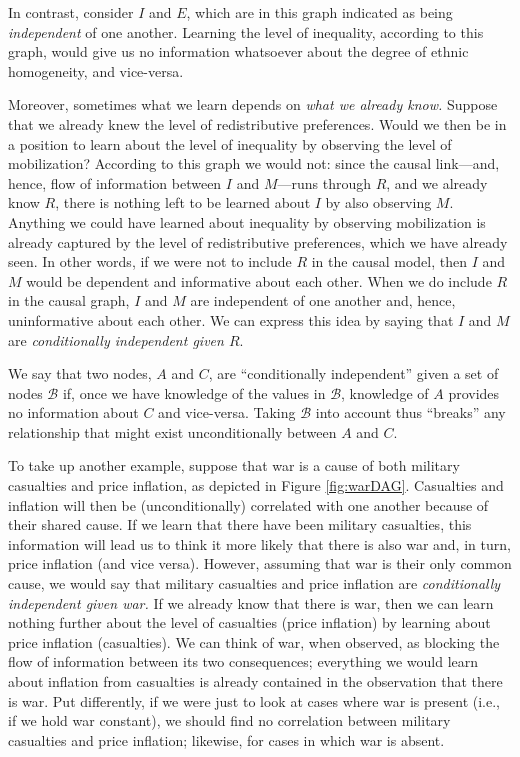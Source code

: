 \documentclass[
  12pt,
]{book}
\begin{document}
In contrast, consider \(I\) and \(E\), which are in this graph indicated as being \emph{independent} of one another. Learning the level of inequality, according to this graph, would give us no information whatsoever about the degree of ethnic homogeneity, and vice-versa.

Moreover, sometimes what we learn depends on \emph{what we already know.} Suppose that we already knew the level of redistributive preferences. Would we then be in a position to learn about the level of inequality by observing the level of mobilization? According to this graph we would not: since the causal link---and, hence, flow of information between \(I\) and \(M\)---runs through \(R\), and we already know \(R\), there is nothing left to be learned about \(I\) by also observing \(M\). Anything we could have learned about inequality by observing mobilization is already captured by the level of redistributive preferences, which we have already seen. In other words, if we were not to include \(R\) in the causal model, then \(I\) and \(M\) would be dependent and informative about each other. When we do include \(R\) in the causal graph, \(I\) and \(M\) are independent of one another and, hence, uninformative about each other. We can express this idea by saying that \(I\) and \(M\) are \emph{conditionally independent given \(R\)}.

We say that two nodes, \(A\) and \(C\), are ``conditionally independent'' given a set of nodes \(\mathcal B\) if, once we have knowledge of the values in \(\mathcal B\), knowledge of \(A\) provides no information about \(C\) and vice-versa. Taking \(\mathcal B\) into account thus ``breaks'' any relationship that might exist unconditionally between \(A\) and \(C\).

To take up another example, suppose that war is a cause of both military casualties and price inflation, as depicted in Figure \ref{fig:warDAG}. Casualties and inflation will then be (unconditionally) correlated with one another because of their shared cause. If we learn that there have been military casualties, this information will lead us to think it more likely that there is also war and, in turn, price inflation (and vice versa). However, assuming that war is their only common cause, we would say that military casualties and price inflation are \emph{conditionally independent given war.} If we already know that there is war, then we can learn nothing further about the level of casualties (price inflation) by learning about price inflation (casualties). We can think of war, when observed, as blocking the flow of information between its two consequences; everything we would learn about inflation from casualties is already contained in the observation that there is war. Put differently, if we were just to look at cases where war is present (i.e., if we hold war constant), we should find no correlation between military casualties and price inflation; likewise, for cases in which war is absent.
\end{document}

